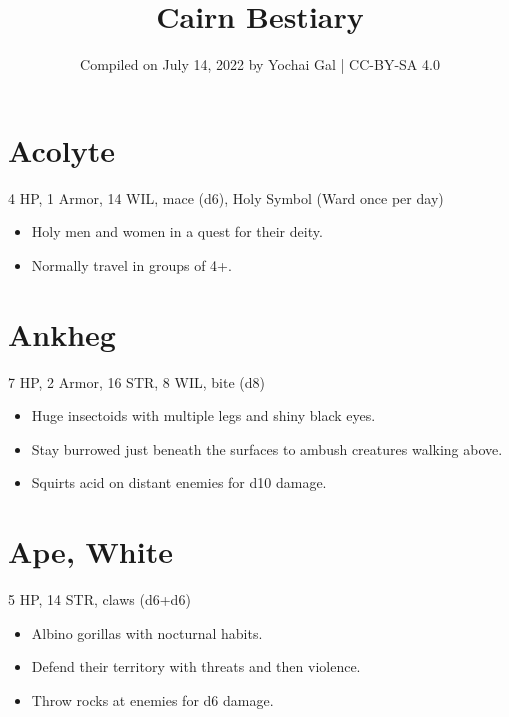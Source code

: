 \documentclass[
  10pt,
  american,
]{article}
\title{Cairn Bestiary}
\subtitle{Compiled on July 14, 2022 by Yochai Gal | CC-BY-SA 4.0}
\date{}
\begin{document}
\maketitle
\begin{multicols}{2}
\let\oldtoc\tableofcontents
\renewcommand{\tableofcontents}{\oldtoc\newpage}
{
\setcounter{tocdepth}{3}
\tableofcontents
}
\end{multicols}

\hypertarget{acolyte}{%
\section{Acolyte}\label{acolyte}}

4 HP, 1 Armor, 14 WIL, mace (d6), Holy Symbol (Ward once per day)

\begin{samepage}
\begin{itemize}
\setlength\itemsep{-.5em}
\item Holy men and women in a quest for their deity.
\item Normally travel in groups of 4+.
\end{itemize}
\end{samepage}

\hypertarget{ankheg}{%
\section{Ankheg}\label{ankheg}}

7 HP, 2 Armor, 16 STR, 8 WIL, bite (d8)

\begin{samepage}
\begin{itemize}
\setlength\itemsep{-.5em}
\item Huge insectoids with multiple legs and shiny black eyes.
\item Stay burrowed just beneath the surfaces to ambush creatures walking above.
\item Squirts acid on distant enemies for d10 damage.
\end{itemize}
\end{samepage}

\hypertarget{ape-white}{%
\section{Ape, White}\label{ape-white}}

5 HP, 14 STR, claws (d6+d6)

\begin{samepage}
\begin{itemize}
\setlength\itemsep{-.5em}
\item Albino gorillas with nocturnal habits.
\item Defend their territory with threats and then violence.
\item Throw rocks at enemies for d6 damage.
\end{itemize}
\end{samepage}
\end{document}
